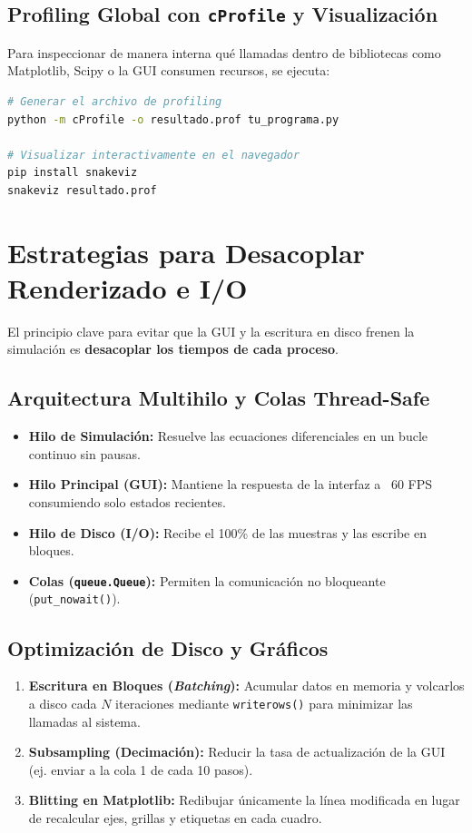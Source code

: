 \documentclass[11pt,a4paper]{article}
\begin{document}
\subsection{Profiling Global con \texttt{cProfile} y Visualización}
Para inspeccionar de manera interna qué llamadas dentro de bibliotecas como Matplotlib, Scipy o la GUI consumen recursos, se ejecuta:

\begin{lstlisting}[language=bash, caption={Uso de cProfile y SnakeViz desde la terminal.}]
# Generar el archivo de profiling
python -m cProfile -o resultado.prof tu_programa.py

# Visualizar interactivamente en el navegador
pip install snakeviz
snakeviz resultado.prof
\end{lstlisting}

\section{Estrategias para Desacoplar Renderizado e I/O}
El principio clave para evitar que la GUI y la escritura en disco frenen la simulación es \textbf{desacoplar los tiempos de cada proceso}.

\subsection{Arquitectura Multihilo y Colas Thread-Safe}
\begin{itemize}
    \item \textbf{Hilo de Simulación:} Resuelve las ecuaciones diferenciales en un bucle continuo sin pausas.
    \item \textbf{Hilo Principal (GUI):} Mantiene la respuesta de la interfaz a ~60 FPS consumiendo solo estados recientes.
    \item \textbf{Hilo de Disco (I/O):} Recibe el 100\% de las muestras y las escribe en bloques.
    \item \textbf{Colas (\texttt{queue.Queue}):} Permiten la comunicación no bloqueante (\texttt{put\_nowait()}).
\end{itemize}

\subsection{Optimización de Disco y Gráficos}
\begin{enumerate}
    \item \textbf{Escritura en Bloques (\textit{Batching}):} Acumular datos en memoria y volcarlos a disco cada $N$ iteraciones mediante \texttt{writerows()} para minimizar las llamadas al sistema.
    \item \textbf{Subsampling (Decimación):} Reducir la tasa de actualización de la GUI (ej. enviar a la cola 1 de cada 10 pasos).
    \item \textbf{Blitting en Matplotlib:} Redibujar únicamente la línea modificada en lugar de recalcular ejes, grillas y etiquetas en cada cuadro.
\end{enumerate}
\end{document}
